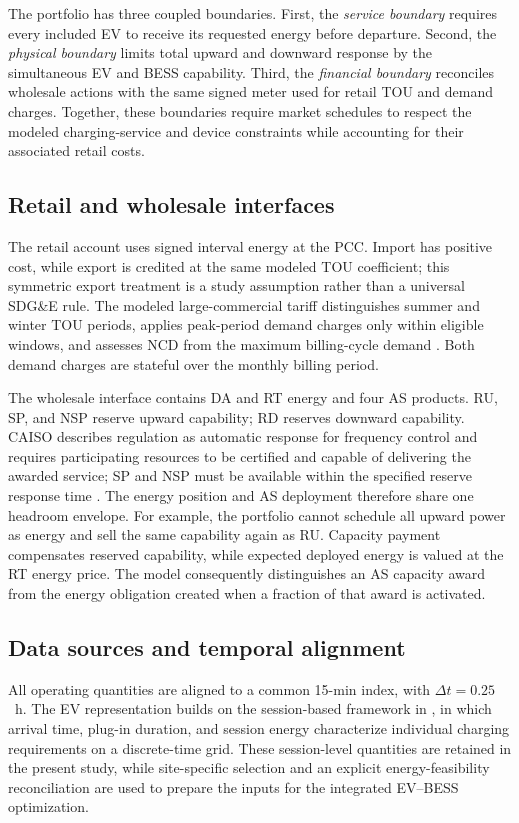 \documentclass[final,5p,times]{elsarticle}
\newcommand{\dt}{\Delta t}
\begin{document}
The portfolio has three coupled boundaries. First, the
\emph{service boundary} requires every included EV to
receive its requested energy before departure. Second,
the \emph{physical boundary} limits total upward and
downward response by the simultaneous EV and BESS
capability. Third, the \emph{financial boundary} reconciles
wholesale actions with the same signed meter used for
retail TOU and demand charges. Together, these boundaries
require market schedules to respect the modeled
charging-service and device constraints while accounting
for their associated retail costs.

\subsection{Retail and wholesale interfaces}
The retail account uses signed interval energy at the PCC. Import has positive cost, while export is credited at the same modeled TOU coefficient; this symmetric export treatment is a study assumption rather than a universal SDG\&E rule. The modeled large-commercial tariff distinguishes summer and winter TOU periods, applies peak-period demand charges only within eligible windows, and assesses NCD from the maximum billing-cycle demand \cite{sdgeLargeCommercial2025,sdgeDemandGuide2026}. Both demand charges are stateful over the monthly billing period.

The wholesale interface contains DA and RT energy and four AS products. RU, SP, and NSP reserve upward capability; RD reserves downward capability. CAISO describes regulation as automatic response for frequency control and requires participating resources to be certified and capable of delivering the awarded service; SP and NSP must be available within the specified reserve response time \cite{caisoAncillary2026}. The energy position and AS deployment therefore share one headroom envelope. For example, the portfolio cannot schedule all upward power as energy and sell the same capability again as RU. Capacity payment compensates reserved capability, while expected deployed energy is valued at the RT energy price. The model consequently distinguishes an AS capacity award from the energy obligation created when a fraction of that award is activated.

\subsection{Data sources and temporal alignment}
All operating quantities are aligned to a common 15-min index,
with $\dt=0.25$~h. The EV representation builds on the
session-based framework in \cite{chen2026realtime}, in which
arrival time, plug-in duration, and session energy characterize
individual charging requirements on a discrete-time grid.
These session-level quantities are retained in the present
study, while site-specific selection and an explicit
energy-feasibility reconciliation are used to prepare the
inputs for the integrated EV--BESS optimization.
\end{document}

